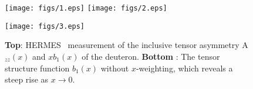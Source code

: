 \label{B1DATASECTION}
%

\begin{figure}
\begin{center}
\texttt{[image: figs/1.eps]}
\hspace{0.5cm}
\texttt{[image: figs/2.eps]}
\vspace{3cm}

\texttt{[image: figs/3.eps]}
\caption{\label{HERMES_AZZ} {\bf Top}: HERMES~\cite{Riedl:2005jq} measurement of the inclusive tensor asymmetry A$_{zz}(x)$ and $xb_1(x)$ of the deuteron. {\bf Bottom} : The tensor structure function $b_1(x)$ without $x$-weighting, which reveals a steep rise as $x\to 0$. 
}
\end{center}\end{figure}





